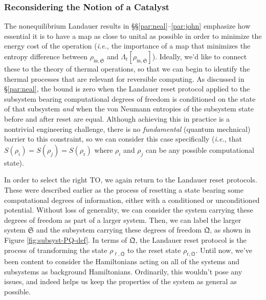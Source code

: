 \documentclass[preprints,article,accept,moreauthors,pdftex]{Definitions/mdpi}
\begin{document}
\begin{paracol}{2}
\subsubsection{Reconsidering the Notion of a Catalyst}
\label{sssec:reversing-catalyst}
The nonequilibrium Landauer results in \S\S\ref{par:neal}--\ref{par:john} emphasize how essential it is to have a map as close to unital as possible in order to minimize the energy cost of the operation (\emph{i.e.}, the importance of a map that minimizes the entropy difference between $\rho_{\mathrm{in},\mathfrak{S}}$ and $\Lambda_{t}\left[\rho_{\mathrm{in},\mathfrak{S}}\right]$). Ideally, we'd like to connect these to the theory of thermal operations, so that we can begin to identify the thermal processes that are relevant for reversible computing. As discussed in \S\ref{par:neal}, the bound is zero when the Landauer reset protocol applied to the subsystem bearing computational degrees of freedom is conditioned on the state of that subsystem \emph{and} when the von Neumann entropies of the subsystem state before and after reset are equal. Although achieving this in practice is a nontrivial engineering challenge, there is no \emph{fundamental} (quantum mechnical) barrier to this constraint, so we can consider this case specifically (\emph{i.e.}, that $S\left(\rho_{i}\right) = S\left(\rho_{j}\right) = S\left(\rho_{\mathrm{r}}\right)$ where $\rho_{i}$ and $\rho_{j}$ can be any possible computational state).

In order to select the right TO, we again return to the Landauer reset protocols. These were described earlier as the process of resetting a state bearing some computational degrees of information, either with a conditioned or unconditioned potential. Without loss of generality, we can consider the system carrying these degrees of freedom as part of a larger system. Then, we can label the larger system $\mathfrak{S}$ and the subsystem carrying these degrees of freedom $\mathfrak{Q}$, as shown in Figure \ref{fig:subsyst-PQ-def}. In terms of $\mathfrak{Q}$, the Landauer reset protocol is the process of transforming the state $\rho_{\ell,\mathfrak{Q}}$ to the reset state $\rho_{\mathrm{r},\mathfrak{Q}}$. Until now, we've been content to consider the Hamiltonians acting on all of the systems and subsystems as background Hamiltonians. Ordinarily, this wouldn't pose any issues, and indeed helps us keep the properties of the system as general as possible.


\end{paracol}
\end{document}
